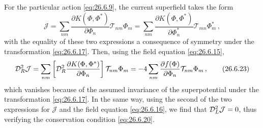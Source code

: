 For the particular action \eqref{eq:26.6.9}, the current superfield takes the
form
\begin{equation}
  \mathcal{J}
  =\sum_{nm}
    \frac{\partial K(\Phi,\Phi^*)}{\partial\Phi_n}
    \mathcal{T}_{nm}\Phi_m
  =\sum_{nm}
    \frac{\partial K(\Phi,\Phi^*)}{\partial\Phi_n^*}
    \mathcal{T}_{mn}\Phi_m^*\,,
  \tag{26.6.22}\label{eq:26.6.22}
\end{equation}
with the equality of these two expressions a consequence of symmetry under
the transformation \eqref{eq:26.6.17}. Then, using the field equation
\eqref{eq:26.6.15},
\begin{equation}
  \mathcal{D}_R^2\mathcal{J}
  =\sum_{nm}
    \left[
      \mathcal{D}_R^2
      \frac{\partial K(\Phi,\Phi^*)}{\partial\Phi_n}
    \right]
    \mathcal{T}_{nm}\Phi_m
  =-4\sum_{nm}
    \frac{\partial f(\Phi)}{\partial\Phi_n}
    \mathcal{T}_{nm}\Phi_m\,,
  \tag{26.6.23}\label{eq:26.6.23}
\end{equation}
which vanishes because of the assumed invariance of the superpotential under
the transformation \eqref{eq:26.6.17}. In the same way, using the second of
the two expressions for \(\mathcal{J}\) and the field equation
\eqref{eq:26.6.16}, we find that \(\mathcal{D}_L^2\mathcal{J}=0\), thus verifying
the conservation condition \eqref{eq:26.6.20}.
